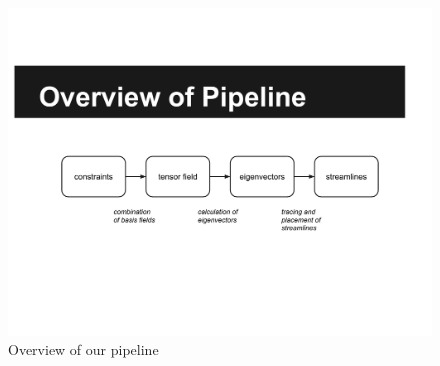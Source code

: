 \documentclass[twocolumn]{article}
\begin{document}
\begin{figure}[t!]
    \begin{center}
        \includegraphics[width=5.5in]{images/pipeline.pdf}
    \end{center}
    \caption{Overview of our pipeline}
    \label{fig:pipeline}
\end{figure}
\end{document}
